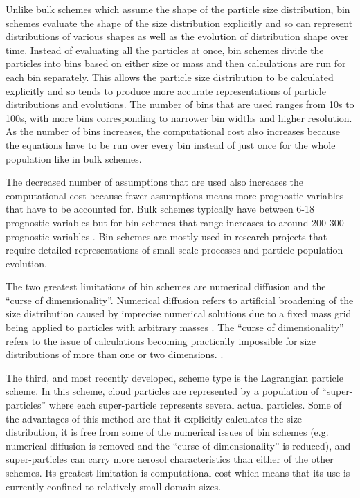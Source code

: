 Unlike bulk schemes which assume the shape of the particle size distribution, bin schemes evaluate the shape of the size distribution explicitly and so can represent distributions of various shapes as well as the evolution of distribution shape over time. Instead of evaluating all the particles at once, bin schemes divide the particles into bins based on either size or mass and then calculations are run for each bin separately. This allows the particle size distribution to be calculated explicitly and so tends to produce more accurate representations of particle distributions and evolutions. The number of bins that are used ranges from 10s to 100s, with more bins corresponding to narrower bin widths and higher resolution. As the number of bins increases, the computational cost also increases because the equations have to be run over every bin instead of just once for the whole population like in bulk schemes. \citep{khai2015,lee2018,grab2019,morr2020}

The decreased number of assumptions that are used also increases the computational cost because fewer assumptions means more prognostic variables that have to be accounted for. Bulk schemes typically have between 6-18 prognostic variables but for bin schemes that range increases to around 200-300 prognostic variables \citep{khai2015}. Bin schemes are mostly used in research projects that require detailed representations of small scale processes and particle population evolution.

The two greatest limitations of bin schemes are numerical diffusion and the ``curse of dimensionality''. Numerical diffusion refers to artificial broadening of the size distribution caused by imprecise numerical solutions due to a fixed mass grid being applied to particles with arbitrary masses \citep{grab2019,lee2019}. The ``curse of dimensionality'' refers to the issue of calculations becoming practically impossible for size distributions of more than one or two dimensions. \citep{grab2019}.

The third, and most recently developed, scheme type is the Lagrangian particle scheme. In this scheme, cloud particles are represented by a population of ``super-particles'' where each super-particle represents several actual particles. Some of the advantages of this method are that it explicitly calculates the size distribution, it is free from some of the numerical issues of bin schemes (e.g. numerical diffusion is removed and the ``curse of dimensionality'' is reduced), and super-particles can carry more aerosol characteristics than either of the other schemes. Its greatest limitation is computational cost which means that its use is currently confined to relatively small domain sizes. \citep{grab2018, grab2019, grab2020, morr2020} 

